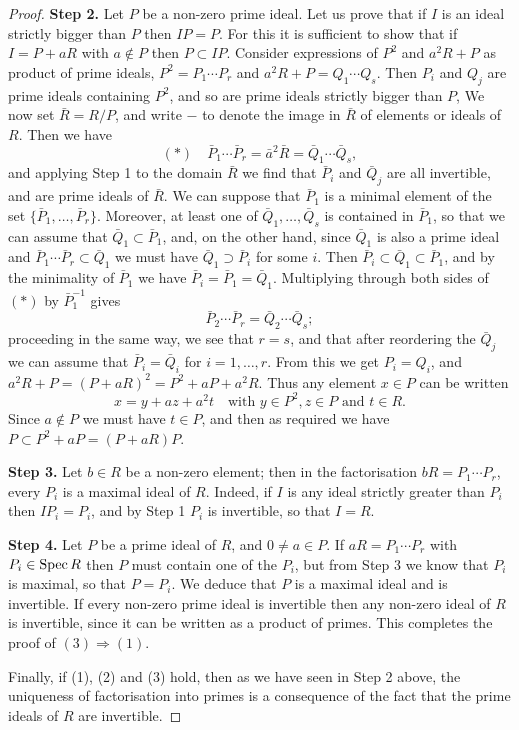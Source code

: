 \begin{proof}
\textbf{Step 2.} Let $P$ be a non-zero prime ideal. Let us prove that if $I$ is an ideal
strictly bigger than $P$ then $IP = P$. For this it is sufficient to show that if
$I = P + aR$ with $a \notin P$ then $P \subset IP$. Consider expressions of $P^2$ and $a^2R + P$
as product of prime ideals, $P^2 = P_1 \cdots P_r$ and $a^2R + P = Q_1 \cdots Q_s$. Then $P_i$
and $Q_j$ are prime ideals containing $P^2$, and so are prime ideals strictly bigger than $P$,
We now set $\bar{R} = R/P$, and write $-$ to denote the image in $\bar{R}$ of
elements or ideals of $R$. Then we have
\[
  (*) \quad \bar{P}_1 \cdots \bar{P}_r = \bar{a}^2\bar{R} = \bar{Q}_1 \cdots \bar{Q}_s,
\]
and applying Step 1 to the domain $\bar{R}$ we find that $\bar{P}_i$ and $\bar{Q}_j$ are all invertible,
and are prime ideals of $\bar{R}$. We can suppose that $\bar{P}_1$ is a minimal element of
the set $\{\bar{P}_1, \ldots, \bar{P}_r\}$. Moreover, at least one of $\bar{Q}_1, \ldots, \bar{Q}_s$ is contained
in $\bar{P}_1$, so that we can assume that $\bar{Q}_1 \subset \bar{P}_1$, and, on the other hand, since
$\bar{Q}_1$ is also a prime ideal and $\bar{P}_1 \cdots \bar{P}_r \subset \bar{Q}_1$ we must have $\bar{Q}_1 \supset \bar{P}_i$
for some $i$. Then $\bar{P}_i \subset \bar{Q}_1 \subset \bar{P}_1$, and by the minimality of $\bar{P}_1$ we have $\bar{P}_i =
\bar{P}_1 = \bar{Q}_1$. Multiplying through both sides of $(*)$ by $\bar{P}_1^{-1}$ gives
\[
  \bar{P}_2 \cdots \bar{P}_r = \bar{Q}_2 \cdots \bar{Q}_s;
\]
proceeding in the same way, we see that $r = s$, and that after reordering the
$\bar{Q}_j$ we can assume that $\bar{P}_i = \bar{Q}_i$ for $i = 1, \ldots, r$. From this we get $P_i = Q_i$, and
$a^2R + P = (P + aR)^2 = P^2 + aP + a^2R$. Thus any element $x \in P$ can be
written
\[
  x = y + az + a^2t \quad \text{with } y \in P^2, z \in P \text{ and } t \in R.
\]
Since $a \notin P$ we must have $t \in P$, and then as required we have
$P \subset P^2 + aP = (P + aR)P$.

\textbf{Step 3.} Let $b \in R$ be a non-zero element; then in the factorisation
$bR = P_1 \cdots P_r$, every $P_i$ is a maximal ideal of $R$. Indeed, if $I$ is any ideal
strictly greater than $P_i$ then $IP_i = P_i$, and by Step 1 $P_i$ is invertible, so that
$I = R$.

\textbf{Step 4.} Let $P$ be a prime ideal of $R$, and $0 \neq a \in P$. If $aR = P_1 \cdots P_r$ with
$P_i \in \operatorname{Spec} R$ then $P$ must contain one of the $P_i$, but from Step 3 we know that
$P_i$ is maximal, so that $P = P_i$. We deduce that $P$ is a maximal ideal and is
invertible. If every non-zero prime ideal is invertible then any non-zero ideal
of $R$ is invertible, since it can be written as a product of primes. This
completes the proof of $(3) \Rightarrow (1)$.

Finally, if (1), (2) and (3) hold, then as we have seen in Step 2 above, the
uniqueness of factorisation into primes is a consequence of the fact that
the prime ideals of $R$ are invertible.
\end{proof}

